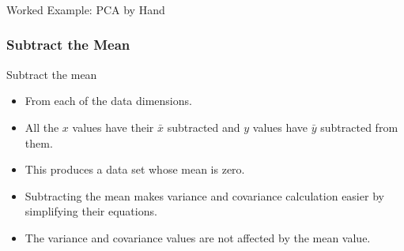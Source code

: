 

\begin{frame}[fragile]\frametitle{}
\begin{center}
{\Large Worked Example: PCA by Hand}
\end{center}
\end{frame}


\begin{frame}[fragile] \frametitle{Subtract the Mean}
Subtract the mean
\begin{itemize}
\item From each of the data dimensions. 
\item All the $x$ values have their $\bar{x}$ subtracted and $y$ values have $\bar{y}$ subtracted 
from them. 
\item This produces a data set whose mean is zero.
\item Subtracting the mean makes variance and covariance 
calculation easier by simplifying their equations. 
\item The 
variance and covariance values are not affected by 
the mean value.
\end{itemize}
\end{frame}






